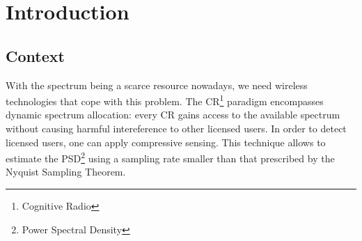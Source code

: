 \documentclass{memoir}
\begin{document}
\chapter{Introduction}

\section{Context}
With the spectrum being a scarce resource nowadays, we need wireless technologies that cope with this problem. The CR\footnote{Cognitive Radio} paradigm encompasses dynamic spectrum allocation: every CR gains access to the available spectrum without causing harmful intereference to other licensed users. In order to
detect licensed users, one can apply compressive sensing. This technique allows to estimate the PSD\footnote{Power Spectral Density} using a sampling rate smaller than that prescribed by the Nyquist Sampling Theorem. 
\end{document}
